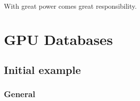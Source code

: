 \begin{savequote}[75mm]
With great power comes great responsibility.
\end{savequote}

\chapter{GPU Databases}



\section{Initial example}

\newpage

\subsection{General}








